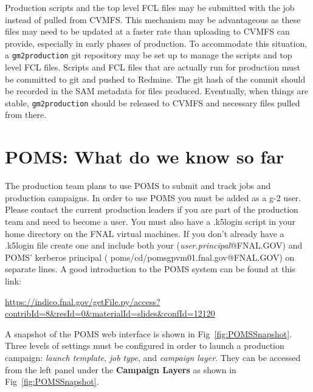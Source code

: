 \noindent Production scripts and the top level FCL files may be submitted with the job instead of pulled from CVMFS. This mechanism may be advantageous as these files may need to be updated at a faster rate than uploading to CVMFS can provide, especially in early phases of production. To accommodate this situation, a {\tt gm2production} git repository may be set up to manage the scripts and top level FCL files. Scripts and FCL files that are actually run for production must be committed to git and pushed to Redmine. The git hash of the commit should be recorded in the SAM metadata for files produced. Eventually, when things are stable, {\tt gm2production} should be released to CVMFS and necessary files pulled from there. 

\section{POMS: What do we know so far}

The production team plans to use POMS to submit and track jobs and production campaigns. In order to use POMS you must be added  as a g-2 user.  Please contact the current production leaders if you are part of the production team and need to become a user.  You must also have a .k5login script in your home directory on the FNAL virtual machines. If you don't already have a .k5login file create one and include both your ({\it{user.principal}}@FNAL.GOV) and POMS' kerberos principal ( poms/cd/pomsgpvm01.fnal.gov@FNAL.GOV) on separate lines.  A good introduction to the POMS system  can be found at this link:

\begin{center}
{\footnotesize
\url{https://indico.fnal.gov/getFile.py/access?contribId=8&resId=0&materialId=slides&confId=12120}}
\end{center}

\noindent A snapshot of the POMS web interface is shown in Fig~\ref{fig:POMSSnapshot}. Three levels of settings must be configured in order to launch a production campaign: {\it{launch template}}, {\it{job type}}, and {\it{campaign layer}}. They can be accessed from the left panel under the \textbf{Campaign Layers} as shown in Fig~\ref{fig:POMSSnapshot}.\\

